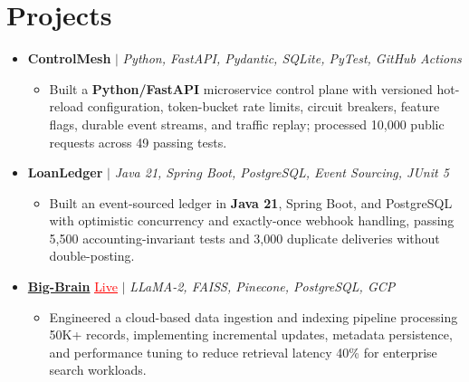 \documentclass[letterpaper,10pt]{article}
\newcommand{\itemTail}{\vspace{-4pt}}
\newcommand{\projGap}{\vspace{3pt}}
\newcommand{\resumeItem}[1]{\item\small{{#1 \itemTail}}}
\newcommand{\resumeProjectHeading}[1]{\item \small #1 \vspace{-2pt}}
\newcommand{\resumeProjectLink}[2]{\href{#1}{\textcolor{red}{\underline{#2}}}}
\newcommand{\resumeSubHeadingListStart}{\begin{itemize}[leftmargin=0.0in, label={}]}
\newcommand{\resumeSubHeadingListEnd}{\end{itemize}}
\newcommand{\resumeProjItemListStart}{\begin{itemize}[leftmargin=0.15in,label=\textbullet,itemsep=3pt,topsep=0pt,parsep=0pt,partopsep=0pt]}
\newcommand{\resumeProjItemListEnd}{\end{itemize}\vspace{-4pt}}
\begin{document}
\section{Projects}
\resumeSubHeadingListStart
\vspace{3pt}
\resumeProjectHeading{\textbf{ControlMesh} $|$ \emph{Python, FastAPI, Pydantic, SQLite, PyTest, GitHub Actions}}
\resumeProjItemListStart
\resumeItem{Built a \textbf{Python/FastAPI} microservice control plane with versioned hot-reload configuration, token-bucket rate limits, circuit breakers, feature flags, durable event streams, and traffic replay; processed 10,000 public requests across 49 passing tests.}
\resumeProjItemListEnd
\projGap
\resumeProjectHeading{\textbf{LoanLedger} $|$ \emph{Java 21, Spring Boot, PostgreSQL, Event Sourcing, JUnit 5}}
\resumeProjItemListStart
\resumeItem{Built an event-sourced ledger in \textbf{Java 21}, Spring Boot, and PostgreSQL with optimistic concurrency and exactly-once webhook handling, passing 5,500 accounting-invariant tests and 3,000 duplicate deliveries without double-posting.}
\resumeProjItemListEnd
\projGap
\resumeProjectHeading{\href{https://big-brain-pied.vercel.app/}{\textbf{Big-Brain}} \resumeProjectLink{https://big-brain-pied.vercel.app/}{Live} $|$ \emph{LLaMA-2, FAISS, Pinecone, PostgreSQL, GCP}}
\resumeProjItemListStart
\resumeItem{Engineered a cloud-based data ingestion and indexing pipeline processing 50K+ records, implementing incremental updates, metadata persistence, and performance tuning to reduce retrieval latency 40\% for enterprise search workloads.}
\resumeProjItemListEnd
\resumeSubHeadingListEnd
\end{document}
